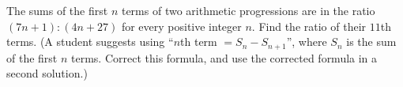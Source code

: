 The sums of the first $n$ terms of two arithmetic progressions are in the ratio $(7n+1):(4n+27)$ for every positive integer $n$. Find the ratio of their $11$th terms. (A student suggests using ``$n$th term $=S_n-S_{n+1}$'', where $S_n$ is the sum of the first $n$ terms. Correct this formula, and use the corrected formula in a second solution.)
